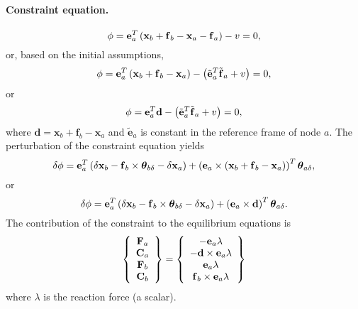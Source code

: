 \documentclass[10pt,dvips,fleqn,subeqn]{report}
\newcommand{\T}[1]{\bm{\mathbf{#1}}}
\begin{document}
\paragraph{Constraint equation.}
\begin{equation}
	\phi = \T{e}_a^T \plbr{\T{x}_b + \T{f}_b - \T{x}_a - \T{f}_a} - v = 0 ,
\end{equation}
or, based on the initial assumptions,
\begin{equation}
	\phi = \T{e}_a^T \plbr{\T{x}_b + \T{f}_b - \T{x}_a}
		- \plbr{\tilde{\T{e}}_a^T \tilde{\T{f}}_a + v} = 0 ,
\end{equation}
or
\begin{equation}
	\phi = \T{e}_a^T \T{d}
		- \plbr{\tilde{\T{e}}_a^T \tilde{\T{f}}_a + v} = 0 ,
\end{equation}
where $\T{d}=\T{x}_b + \T{f}_b - \T{x}_a$ 
and $\tilde{\T{e}}_a$ is constant in the reference frame of node $a$.
The perturbation of the constraint equation yields
\begin{equation}
	\delta\phi = 
		\T{e}_a^T \plbr{\delta\T{x}_b
		- \T{f}_b\times\T{\theta}_{b\delta}
		- \delta\T{x}_a
		} + \plbr{\T{e}_a \times \plbr{
			\T{x}_b + \T{f}_b - \T{x}_a
		}}^T \T{\theta}_{a\delta} ,
\end{equation}
or
\begin{equation}
	\delta\phi = 
		\T{e}_a^T \plbr{\delta\T{x}_b
		- \T{f}_b\times\T{\theta}_{b\delta}
		- \delta\T{x}_a
		} + \plbr{\T{e}_a \times \T{d}}^T \T{\theta}_{a\delta} .
\end{equation}
The contribution of the constraint to the equilibrium equations is
\begin{equation}
	\cubr{\cvvect{
		\T{F}_a \\
		\T{C}_a \\
		\T{F}_b \\
		\T{C}_b
	}} = \cubr{\cvvect{
		- \T{e}_a \lambda \\
		- \T{d} \times \T{e}_a \lambda \\
		\T{e}_a \lambda \\
		\T{f}_b \times \T{e}_a \lambda
	}}
\end{equation}
where $\lambda$ is the reaction force (a scalar).
\end{document}
